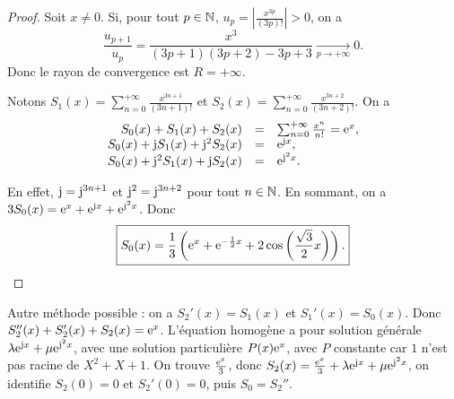 \documentclass[12pt]{article}
\begin{document}
\begin{proof}
    Soit $x\neq0$. Si, pour tout $p\in\mathbb{N}$, $u_p=\left\lvert\frac{x^{3p}}{(3p)!}\right\rvert>0$, on a 
    \begin{equation}
        \frac{u_{p+1}}{u_{p}}=\frac{x^{3}}{(3p+1)(3p+2)-3p+3}\xrightarrow[p\to+\infty]{}0.
    \end{equation}
    Donc le rayon de convergence est $R=+\infty$.

    Notons $S_1(x)=\sum_{n=0}^{+\infty}\frac{x^{3n+1}}{(3n+1)!}$ et $S_2(x)=\sum_{n=0}^{+\infty}\frac{x^{3n+2}}{(3n+2)!}$. On a 
    \begin{equation}
        \begin{array}[]{rcl}
            S_0(x)+S_1(x)+S_2(x) &=& \sum_{n=0}^{+\infty}\frac{x^{n}}{n!}=\e^{x},\\
            S_0(x)+\j S_{1}(x)+\j^{2}S_{2}(x) &=& \e^{\j x},\\
            S_0(x)+\j^{2} S_{1}(x)+\j S_{2}(x) &=& \e^{\j^{2} x}.
        \end{array}
    \end{equation}

    En effet, $\mathrm{j}=\mathrm{j}^{3n+1}$ et $\mathrm{j}^{2}=\mathrm{j}^{3n+2}$ pour tout $n\in\mathbb{N}$. En sommant, on a $3S_{0}(x)=\mathrm{e}^{x}+\mathrm{e}^{\mathrm{j} x}+\mathrm{e}^{\mathrm{j}^{2}x}$. Donc 
    \begin{equation}
        \boxed{
            S_0(x)=\frac{1}{3}\left(\mathrm{e}^{x}+\mathrm{e}^{-\frac{1}{2}x}+2\cos\left(\frac{\sqrt{3}}{2}x\right)\right).
        }
    \end{equation}
\end{proof}

\begin{remark}
    Autre méthode possible : on a $S_2'(x)=S_1(x)$ et $S_1'(x)=S_0(x)$. Donc $S_{2}''(x)+S_2'(x)+S_2(x)=\mathrm{e}^{x}$. L'équation homogène a pour solution générale $\lambda \mathrm{e}^{\mathrm{j} x}+\mu\mathrm{e}^{\mathrm{j}^{2}x}$, avec une solution particulière $P(x)\mathrm{e}^{x}$, avec $P$ constante car $1$ n'est pas racine de $X^{2}+X+1$. On trouve $\frac{\mathrm{e}^{x}}{3}$, donc $S_2(x)=\frac{\mathrm{e}^{x}}{3}+\lambda\mathrm{e}^{\mathrm{j} x}+\mu\mathrm{e}^{\mathrm{j}^{2}x}$, on identifie $S_2(0)=0$ et $S_2'(0)=0$, puis $S_0=S_2''$.
\end{remark}
\end{document}
